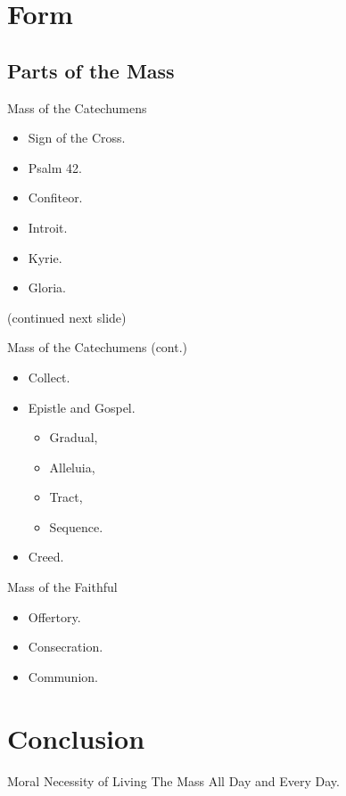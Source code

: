 \documentclass{beamer}
\begin{document}
\section{Form}

\subsection{Parts of the Mass}

\begin{frame}{Mass of the Catechumens}
\begin{itemize}
\item Sign of the Cross. 
\item Psalm  42.  
\item  Confiteor. 
\item  Introit. 
\item  Kyrie. 
\item Gloria. 
\end{itemize}
(continued next slide)
\end{frame}

\begin{frame}{Mass of the Catechumens (cont.)}
\begin{itemize}
\item Collect. 
\item Epistle and Gospel.  
\begin{itemize}
\item  Gradual,
\item  Alleluia,
\item Tract, 
\item Sequence. 
\end{itemize}
\item Creed.
\end{itemize}
\end{frame}

\begin{frame}{Mass of the Faithful}
\begin{itemize}
\item Offertory.
\item Consecration.
\item Communion.
\end{itemize}
\end{frame}

\section{Conclusion}

\begin{frame}{Moral}
Necessity of Living The Mass All Day and Every Day.
\end{frame}
\end{document}
